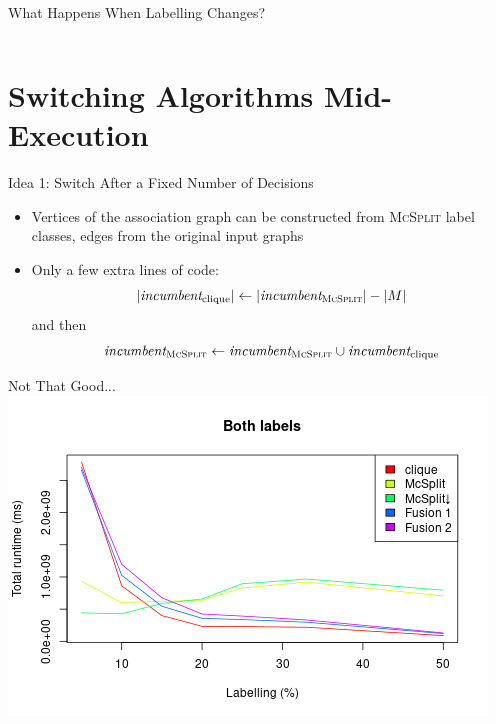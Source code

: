 \documentclass{beamer}
\begin{document}
\begin{frame}{What Happens When Labelling Changes?}
\begin{columns}
\begin{column}{0.5\textwidth}
    \end{column}
  \end{columns}
\end{frame}

\section{Switching Algorithms Mid-Execution}

\begin{frame}{Idea 1: Switch After a Fixed Number of Decisions}
  \pause
  \begin{itemize}
  \item Vertices of the association graph can be constructed from \textsc{McSplit}
    label classes, edges from the original input graphs
  \item Only a few extra lines of code:
    \[ |\textit{incumbent}_{\text{clique}}| \gets
      |\textit{incumbent}_{\text{\textsc{McSplit}}}| - |M| \]
    and then
    \[ \textit{incumbent}_{\textsc{McSplit}} \gets
      \textit{incumbent}_{\textsc{McSplit}} \cup
      \textit{incumbent}_{\text{clique}} \]
  \end{itemize}
\end{frame}

\begin{frame}{Not That Good...}
  \centering
  \includegraphics[scale=0.5]{../dissertation/images/fusion_linechart.png}
\end{frame}
\end{document}
